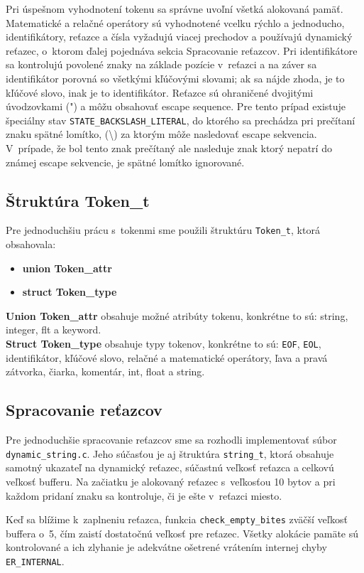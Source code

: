 \documentclass [11pt, a4paper]{article}
\begin{document}
Pri úspešnom vyhodnotení tokenu sa správne uvoľní všetká alokovaná pamäť. Matematické a relačné operátory sú vyhodnotené vcelku rýchlo a jednoducho, identifikátory, reťazce a čísla vyžadujú viacej prechodov a používajú dynamický reťazec, o~ktorom ďalej pojednáva sekcia Spracovanie reťazcov. Pri identifikátore sa kontrolujú povolené znaky na základe pozície v~reťazci a na záver sa identifikátor porovná so všetkými kľúčovými slovami; ak sa nájde zhoda, je to kľúčové slovo, inak je to identifikátor. Reťazce sú ohraničené dvojitými úvodzovkami (") a môžu obsahovať escape sequence. Pre tento prípad existuje špeciálny stav \texttt{STATE\_BACKSLASH\_LITERAL}, do ktorého sa prechádza pri  prečítaní znaku spätné lomítko, (\textbackslash) za ktorým môže nasledovať escape sekvencia. V~prípade, že bol tento znak prečítaný ale nasleduje znak ktorý nepatrí  do známej escape sekvencie, je spätné lomítko ignorované.

\subsection{Štruktúra Token\_t}
Pre jednoduchšiu prácu s~tokenmi sme použili štruktúru \texttt{Token\_t}, ktorá obsahovala:

\begin{itemize}
\item \textbf{union Token\_attr}
\item \textbf{struct Token\_type}
\end{itemize}
\textbf{Union Token\_attr} obsahuje možné atribúty tokenu, konkrétne to sú: string, integer, flt a keyword. \\
\textbf{Struct Token\_type} obsahuje typy tokenov, konkrétne to sú: \texttt{EOF}, \texttt{EOL}, identifikátor, kľúčové slovo, relačné a matematické operátory, ľava a pravá zátvorka, čiarka, komentár, int, float a string.


\subsection{Spracovanie reťazcov}
Pre jednoduchšie spracovanie reťazcov sme sa rozhodli implementovať súbor \texttt{dynamic\_string.c}. Jeho súčasťou je aj štruktúra \texttt{string\_t}, ktorá obsahuje samotný ukazateľ na dynamický reťazec, súčastnú veľkosť reťazca a celkovú veľkosť bufferu. Na začiatku je alokovaný reťazec s~veľkosťou 10 bytov a pri každom pridaní znaku sa kontroluje, či je ešte v~reťazci miesto. 

Keď sa blížime k~zaplneniu reťazca, funkcia \texttt{check\_empty\_bites} zväčší veľkosť buffera o~5, čím zaistí dostatočnú veľkosť pre reťazec. Všetky alokácie pamäte sú kontrolované a ich zlyhanie je adekvátne ošetrené vrátením internej chyby \texttt{ER\_INTERNAL}.
\end{document}
